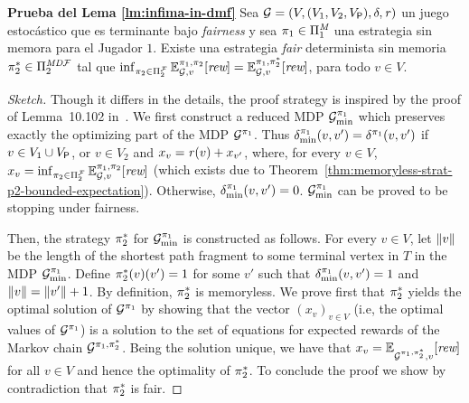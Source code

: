 \noindent
\textbf{Prueba del Lema \ref{lm:infima-in-dmf}}%
  Sea $\mathcal{G}= (V, (V_1, V_2, V_{\mathsf{P}}), \delta, \mathit{r})$ un
  juego estocástico que es terminante bajo \emph{fairness} y sea
  $\pi_{1} \in \Pi^{\textit{M}}_{1}$ una estrategia sin memora para el Jugador $1$.  Existe una estrategia \emph{fair} determinista sin memoria
  $\pi^*_{2}\in\Pi^{\textit{MD}\mathcal{F}}_{2}$ tal que
  $\inf_{\pi_{2} \in \Pi^{\mathcal{F}}_{2}} \mathbb{E}^{\pi_{1}, \pi_{2}}_{\mathcal{G},v}[\textit{rew}]
   =
   \mathbb{E}^{\pi_{1}, \pi^*_{2}}_{\mathcal{G},v}[\textit{rew}]$, para todo $v \in V$.
\noindent \\
%
\iffalse
\begin{proof}[Sketch]
  Though it differs in the details, the proof strategy is inspired by
  the proof of Lemma~10.102 in~\cite{BaierK08}.
  We first construct a reduced MDP $\mathcal{G}^{\pi_{1}}_{\min}$ which
  preserves exactly the optimizing part of the MDP
  $\mathcal{G}^{\pi_{1}}$.
  Thus $\delta^{\pi_{1}}_{\min}(v,v')=\delta^{\pi_{1}}(v,v')$ if
  $v\in V_1\cup V_{\mathsf{P}}$, or $v\in V_2$ and
  $x_v=\mathit{r}(v)+x_{v'}$, where, for every $v\in V$,
  $x_v = \inf_{\pi_{2} \in \Pi^{\mathcal{F}}_{2}} \mathbb{E}^{\pi_{1}, \pi_{2}}_{\mathcal{G},v}[\textit{rew}]$
  (which exists due to Theorem~\ref{thm:memoryless-strat-p2-bounded-expectation}).
  Otherwise, $\delta^{\pi_{1}}_{\min}(v,v')=0$.
  $\mathcal{G}^{\pi_{1}}_{\min}$ can be proved to be stopping under fairness.

  Then, the strategy $\pi^*_{2}$ for
  $\mathcal{G}^{\pi_{1}}_{\min}$ is constructed as follows.  For every
  $v\in V$, let ${\lVert{v}\rVert}$ be the length of the shortest path
  fragment to some terminal vertex in $T$ in the MDP
  $\mathcal{G}^{\pi_{1}}_{\min}$.  Define $\pi^*_{2}(v)(v')=1$
  for some $v'$ such that $\delta^{\pi_{1}}_{\min}(v,v')=1$ and
  ${\lVert{v}\rVert}={\lVert{v'}\rVert}+1$.
  By definition, $\pi^*_{2}$ is  memoryless.  We prove first that
  $\pi^*_{2}$ yields the optimal solution of
  $\mathcal{G}^{\pi_{1}}$ by showing that the vector $(x_v)_{v\in V}$
  (i.e, the optimal values of $\mathcal{G}^{\pi_{1}}$) is a solution to
  the set of equations for expected rewards of the Markov chain
  $\mathcal{G}^{\pi_{1},\pi^*_{2}}$.  Being the solution unique,
  we have that
  $x_v=\mathbb{E}^{}_{\mathcal{G}^{\pi_{1},\pi^*_{2}},v}[\textit{rew}]$
  for all $v\in V$ and hence the optimality of $\pi^*_{2}$.
  To conclude the proof we show by contradiction that
  $\pi^*_{2}$ is fair.
\qedhere
\end{proof}
